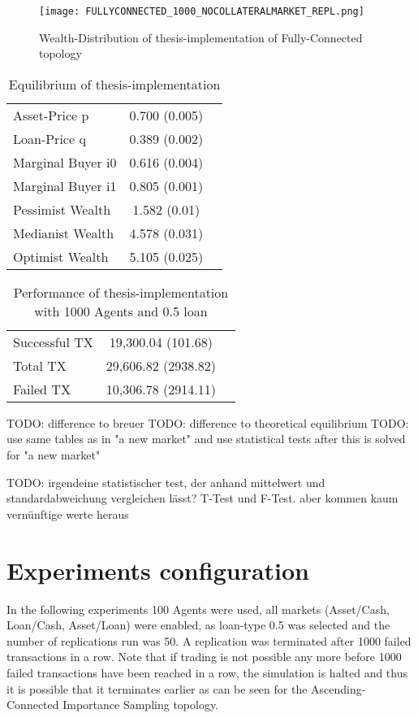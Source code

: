 \documentclass[Bachelorarbeit.tex]{subfiles}
\begin{document}
\begin{figure}[H]
	\centering
  \texttt{[image: FULLYCONNECTED\_1000\_NOCOLLATERALMARKET\_REPL.png]}
	\caption{Wealth-Distribution of thesis-implementation of Fully-Connected topology}
	\label{fig:wealth_FULLYCONNECTED_1000_NOCOLLATERALMARKET_REPL}
\end{figure}

\begin{table}[H]
	\centering
	\caption{Equilibrium of thesis-implementation}
	\begin{tabular} { l c r }
		\hline
		Asset-Price p & 0.700 (0.005) \\
		Loan-Price q & 0.389 (0.002) \\
		Marginal Buyer i0 & 0.616 (0.004) \\
		Marginal Buyer i1 & 0.805 (0.001) \\
		\hline
		Pessimist Wealth & 1.582 (0.01) \\
		Medianist Wealth & 4.578 (0.031) \\
		Optimist Wealth & 5.105 (0.025) \\
		\hline
	\end{tabular}
\end{table}

\begin{table}[H]
	\centering
	\caption{Performance of thesis-implementation with 1000 Agents and 0.5 loan}
	\begin{tabular} { l c r }
		\hline
		Successful TX & 19,300.04 (101.68) \\
		Total TX & 29,606.82 (2938.82) \\
		Failed TX & 10,306.78 (2914.11) \\
		\hline
	\end{tabular}
\end{table}

TODO: difference to breuer 
TODO: difference to theoretical equilibrium
TODO: use same tables as in "a new market" and use statistical tests after this is solved for "a new market"

TODO: irgendeine statistischer test, der anhand mittelwert und standardabweichung vergleichen lässt?
T-Test und F-Test.
aber kommen kaum vernünftige werte heraus


\section{Experiments configuration}
In the following experiments 100 Agents were used, all markets (Asset/Cash, Loan/Cash, Asset/Loan) were enabled, as loan-type 0.5 was selected and the number of replications run was 50. A replication was terminated after 1000 failed transactions in a row. Note that if trading is not possible any more before  1000 failed transactions have been reached in a row, the simulation is halted and thus it is possible that it terminates earlier as can be seen for the Ascending-Connected Importance Sampling topology.
\end{document}
